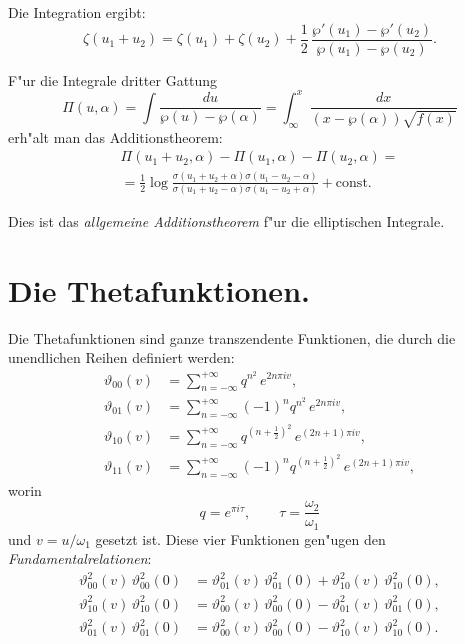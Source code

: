 \documentclass[12pt,a4paper]{article}
\theoremstyle{definition}
\begin{document}
Die Integration ergibt:
\begin{equation}\tag{3}
\zeta(u_1 + u_2) = \zeta(u_1) + \zeta(u_2) + \frac{1}{2}\,\frac{\wp'(u_1) - \wp'(u_2)}{\wp(u_1) - \wp(u_2)}.
\end{equation}

F"ur die Integrale dritter Gattung
\begin{equation}\tag{4}
\Pi(u,\alpha) = \int\frac{du}{\wp(u) - \wp(\alpha)} = \int_\infty^x \frac{dx}{(x - \wp(\alpha))\sqrt{f(x)}}
\end{equation}
erh"alt man das Additionstheorem:
\begin{multline}\tag{5}
\Pi(u_1 + u_2, \alpha) - \Pi(u_1, \alpha) - \Pi(u_2, \alpha) = \\
= \frac{1}{2}\log\frac{\sigma(u_1 + u_2 + \alpha)\sigma(u_1 - u_2 - \alpha)}{\sigma(u_1 + u_2 - \alpha)\sigma(u_1 - u_2 + \alpha)} + \text{const}.
\end{multline}

Dies ist das \emph{allgemeine Additionstheorem} f"ur die elliptischen Integrale.

\newpage

\section{Die Thetafunktionen.}

Die Thetafunktionen sind ganze transzendente Funktionen, die durch die unendlichen Reihen definiert werden:
\begin{align*}
\vartheta_{00}(v) &= \sum_{n=-\infty}^{+\infty} q^{n^2}\,e^{2n\pi iv},\\
\vartheta_{01}(v) &= \sum_{n=-\infty}^{+\infty} (-1)^n q^{n^2}\,e^{2n\pi iv},\\
\vartheta_{10}(v) &= \sum_{n=-\infty}^{+\infty} q^{(n+\frac{1}{2})^2}\,e^{(2n+1)\pi iv},\\
\vartheta_{11}(v) &= \sum_{n=-\infty}^{+\infty} (-1)^n q^{(n+\frac{1}{2})^2}\,e^{(2n+1)\pi iv},
\end{align*}
worin
\[q = e^{\pi i\tau},\qquad \tau = \frac{\omega_2}{\omega_1}
\]
und $v = u/\omega_1$ gesetzt ist. Diese vier Funktionen gen"ugen den \emph{Fundamentalrelationen}:
\begin{align*}
\vartheta_{00}^2(v)\,\vartheta_{00}^2(0) &= \vartheta_{01}^2(v)\,\vartheta_{01}^2(0) + \vartheta_{10}^2(v)\,\vartheta_{10}^2(0),\\
\vartheta_{10}^2(v)\,\vartheta_{10}^2(0) &= \vartheta_{00}^2(v)\,\vartheta_{00}^2(0) - \vartheta_{01}^2(v)\,\vartheta_{01}^2(0),\\
\vartheta_{01}^2(v)\,\vartheta_{01}^2(0) &= \vartheta_{00}^2(v)\,\vartheta_{00}^2(0) - \vartheta_{10}^2(v)\,\vartheta_{10}^2(0).
\end{align*}
\end{document}
